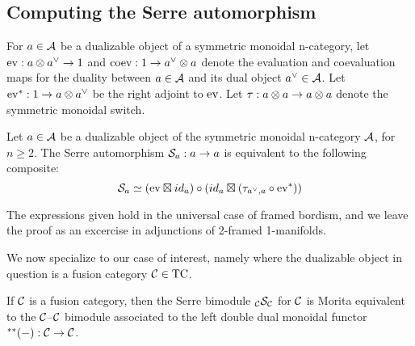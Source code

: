 \documentclass{amsart}
\begin{document}
\subsection{Computing the Serre automorphism}

For $a \in \mathcal A$ be a dualizable object of a symmetric monoidal n-category, let $\mathrm{ev} : a \otimes a^{\vee} \rightarrow 1$ and $\mathrm{coev}: 1 \rightarrow a^{\vee} \otimes a$ denote the evaluation and coevaluation maps for the duality between $a \in \mathcal A$ and its dual object $a^{\vee} \in \mathcal A$.  Let $\mathrm{ev}^*: 1 \rightarrow a \otimes a^{\vee}$ be the right adjoint to $\mathrm{ev}$.  Let $\tau: a \otimes a \rightarrow a \otimes a$ denote the symmetric monoidal switch.

\begin{proposition}
Let $a \in \mathcal A$ be a dualizable object of the symmetric monoidal n-category $\mathcal A$, for $n \geq 2$.  The Serre automorphism $\mathcal S_a : a \rightarrow a$ is equivalent to the following composite:
$$\mathcal S_a \simeq (\mathrm{ev} \boxtimes {id}_a) \circ ({id}_a \boxtimes (\tau_{a^\vee,a} \circ  \mathrm{ev}^*))$$
\end{proposition}

The expressions given hold in the universal case of framed bordism, and we leave the proof as an excercise in adjunctions of 2-framed 1-manifolds.

We now specialize to our case of interest, namely where the dualizable object in question is a fusion category $\mathcal C \in \mathrm{TC}$.


\begin{theorem} \label{thm-serre}
If $\mathcal C$ is a fusion category, then the Serre bimodule ${}_{\mathcal C} {\mathcal S}_{\mathcal C}$ for $\mathcal C$ is Morita equivalent to the $\mathcal C$--$\mathcal C$ bimodule associated to the left double dual monoidal functor ${}^{**}{(-)}: \mathcal C \rightarrow \mathcal C$.
\end{theorem}
\end{document}
